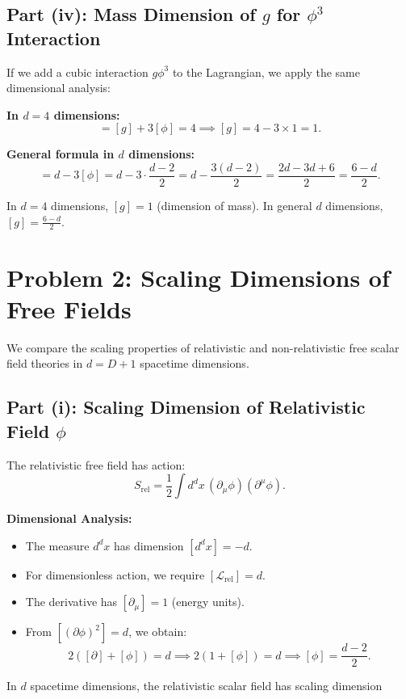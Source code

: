 \documentclass[11pt, a4paper]{article}
\newcommand{\Lscr}{\mathcal{L}}
\newcommand{\be}{\begin{equation}}
\newcommand{\ee}{\end{equation}}
\begin{document}
\subsection{Part (iv): Mass Dimension of $g$ for $\phi^3$ Interaction}

If we add a cubic interaction $g\phi^3$ to the Lagrangian, we apply the same dimensional analysis:

\textbf{In $d = 4$ dimensions:}
\be
[g\phi^3] = [g] + 3[\phi] = 4 \implies [g] = 4 - 3 \times 1 = 1.
\ee

\textbf{General formula in $d$ dimensions:}
\be
[g] = d - 3[\phi] = d - 3 \cdot \frac{d-2}{2} = d - \frac{3(d-2)}{2} = \frac{2d - 3d + 6}{2} = \frac{6-d}{2}.
\ee

In $d=4$ dimensions, $[g] = 1$ (dimension of mass). In general $d$ dimensions, $[g] = \frac{6-d}{2}$.

\section{Problem 2: Scaling Dimensions of Free Fields}

We compare the scaling properties of relativistic and non-relativistic free scalar field theories in $d = D+1$ spacetime dimensions.

\subsection{Part (i): Scaling Dimension of Relativistic Field $\phi$}

The relativistic free field has action:
\be
S_{\text{rel}}=\frac{1}{2}\int d^{d}x\,(\partial_{\mu}\phi)(\partial^{\mu}\phi).
\ee

\textbf{Dimensional Analysis:}
\begin{itemize}
    \item The measure $d^dx$ has dimension $[d^dx] = -d$.
    \item For dimensionless action, we require $[\Lscr_{\text{rel}}] = d$.
    \item The derivative has $[\partial_\mu] = 1$ (energy units).
    \item From $[(\partial\phi)^2] = d$, we obtain:
    \be
    2([\partial] + [\phi]) = d \implies 2(1 + [\phi]) = d \implies [\phi] = \frac{d-2}{2}.
    \ee
\end{itemize}

In $d$ spacetime dimensions, the relativistic scalar field has scaling dimension 
\end{document}
